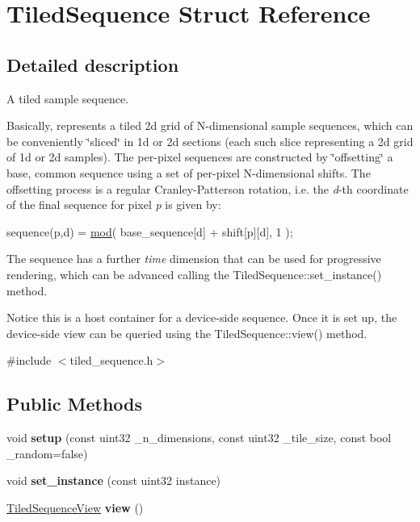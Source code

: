 \hypertarget{struct_tiled_sequence}{}\section{Tiled\+Sequence Struct Reference}
\label{struct_tiled_sequence}


\subsection{Detailed description}
A tiled sample sequence.

\begin{DoxyParagraph}{}
Basically, represents a tiled 2d grid of N-\/dimensional sample sequences, which can be conveniently \char`\"{}sliced\char`\"{} in 1d or 2d sections (each such slice representing a 2d grid of 1d or 2d samples). The per-\/pixel sequences are constructed by \char`\"{}offsetting\char`\"{} a base, common sequence using a set of per-\/pixel N-\/dimensional shifts. The offsetting process is a regular Cranley-\/\+Patterson rotation, i.\+e. the {\itshape d}-\/th coordinate of the final sequence for pixel {\itshape p} is given by\+: ~\newline

\begin{DoxyCode}
sequence(p,d) = \hyperlink{group___basic_gaa6ea8810d6e0f5f42d49be632566378c}{mod}( base\_sequence[d] + shift[p][d], 1 );
\end{DoxyCode}
 The sequence has a further {\itshape time} dimension that can be used for progressive rendering, which can be advanced calling the Tiled\+Sequence\+::set\+\_\+instance() method. 
\end{DoxyParagraph}
\begin{DoxyParagraph}{}
Notice this is a host container for a device-\/side sequence. Once it is set up, the device-\/side view can be queried using the Tiled\+Sequence\+::view() method. 
\end{DoxyParagraph}


{\ttfamily \#include $<$tiled\+\_\+sequence.\+h$>$}

\subsection*{Public Methods}
\begin{DoxyCompactItemize}
\item 
\mbox{\label{struct_tiled_sequence_a5260fe70f7d5c3aa736efccce4f4bc1c}} 
void {\bfseries setup} (const uint32 \+\_\+n\+\_\+dimensions, const uint32 \+\_\+tile\+\_\+size, const bool \+\_\+random=false)
\item 
\mbox{\label{struct_tiled_sequence_a4b7fa2dedf87c00b86d87b8e00ecb947}} 
void {\bfseries set\+\_\+instance} (const uint32 instance)
\item 
\mbox{\label{struct_tiled_sequence_ab5b65e36837cc7cd30d45b78e316447a}} 
\hyperlink{struct_tiled_sequence_view}{Tiled\+Sequence\+View} {\bfseries view} ()
\end{DoxyCompactItemize}
